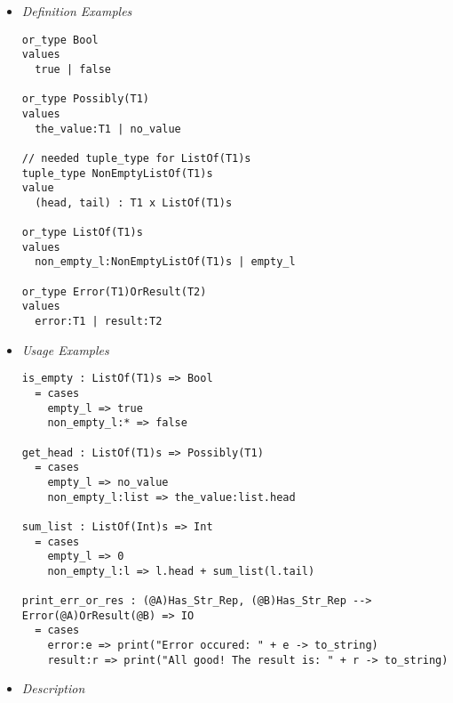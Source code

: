 \documentclass{article}
\begin{document}
\begin{itemize}
\item \textit{Definition Examples}

\begin{verbatim}
or_type Bool
values
  true | false

or_type Possibly(T1)
values
  the_value:T1 | no_value

// needed tuple_type for ListOf(T1)s
tuple_type NonEmptyListOf(T1)s
value
  (head, tail) : T1 x ListOf(T1)s

or_type ListOf(T1)s
values
  non_empty_l:NonEmptyListOf(T1)s | empty_l

or_type Error(T1)OrResult(T2)
values
  error:T1 | result:T2
\end{verbatim}

\item \textit{Usage Examples}

\begin{verbatim}
is_empty : ListOf(T1)s => Bool
  = cases
    empty_l => true
    non_empty_l:* => false

get_head : ListOf(T1)s => Possibly(T1)
  = cases
    empty_l => no_value
    non_empty_l:list => the_value:list.head

sum_list : ListOf(Int)s => Int
  = cases
    empty_l => 0
    non_empty_l:l => l.head + sum_list(l.tail)

print_err_or_res : (@A)Has_Str_Rep, (@B)Has_Str_Rep --> Error(@A)OrResult(@B) => IO
  = cases
    error:e => print("Error occured: " + e -> to_string)
    result:r => print("All good! The result is: " + r -> to_string)
\end{verbatim}

\item \textit{Description}


\end{itemize}
\end{document}
